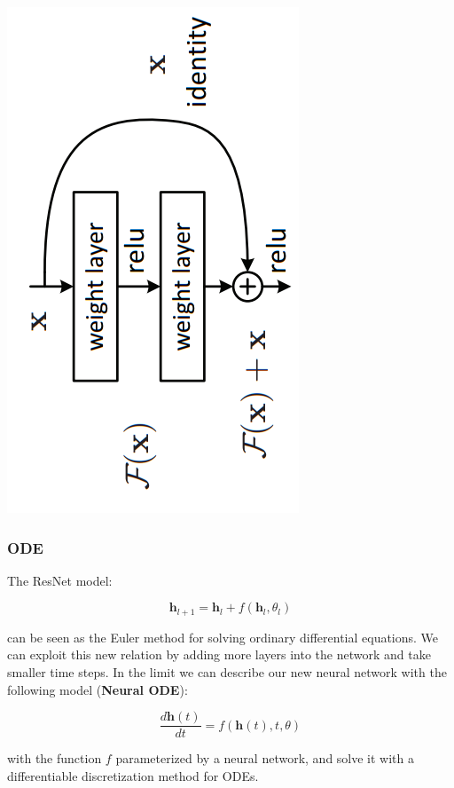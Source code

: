 \documentclass{beamer}
\begin{document}
{\begin{frame}
	\begin{center}
	\includegraphics[scale = 0.4]{resnet.png}
         \end{center}

\end{frame}
\begin{frame}
	\frametitle{ODE}
	The ResNet model:

	\begin{equation}
	\textbf{h}_{l+1} =\textbf{h}_l + f(\textbf{h}_l, \theta_l)
	\end{equation}

	can be seen as  the Euler method for solving ordinary differential equations. We can exploit this new relation by adding more layers into the network and take smaller time steps.  In the limit we can describe our new neural network with the following model (\textbf{Neural ODE}):

	\begin{equation}
	\frac{d \textbf{h}(t)}{dt} = f(\textbf{h}(t), t, \theta)
	\end{equation}

	 with the function $f$ parameterized by a neural network, and solve it with a differentiable discretization method for ODEs.
\end{frame}

}
\end{document}

